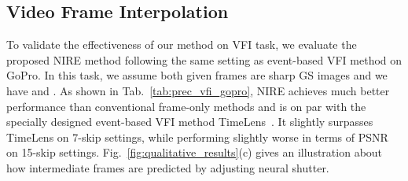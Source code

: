 \documentclass[10pt,twocolumn,letterpaper]{article}
\begin{document}
\subsection{Video Frame Interpolation}
To validate the effectiveness of our method on VFI task,
we evaluate the proposed NIRE method following the same setting as event-based VFI method\cite{TimeLens} on GoPro. 
In this task, we assume both given frames are sharp GS images and we have  and .
As shown in Tab.~\ref{tab:prec_vfi_gopro}, NIRE achieves much better performance than conventional frame-only methods and is on par with the specially designed event-based VFI method TimeLens~\cite{TimeLens}.
It slightly surpasses TimeLens on 7-skip settings, while performing slightly worse in terms of PSNR on 15-skip settings.
Fig.~\ref{fig:qualitative_results}(c) gives an illustration about how intermediate frames are predicted by adjusting neural shutter.
\begin{table}[h!]
\caption{Performance on video frame interpolation}
\centering
{}
\label{tab:prec_vfi_gopro}
\end{table}
\end{document}
